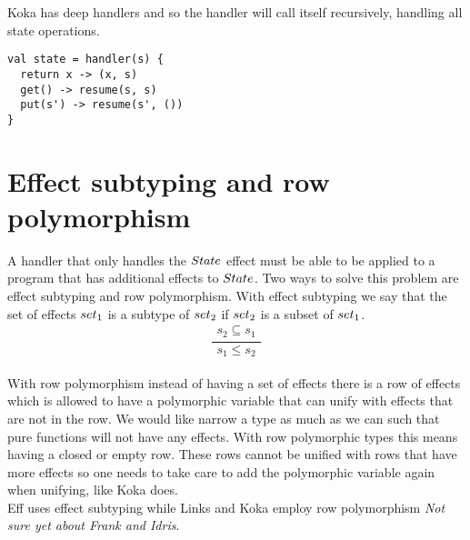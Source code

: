 Koka has deep handlers and so the handler will call itself recursively, handling all state operations.
\begin{lstlisting}
val state = handler(s) {
  return x -> (x, s)
  get() -> resume(s, s)
  put(s') -> resume(s', ())
}
\end{lstlisting}


\section{Effect subtyping and row polymorphism}
A handler that only handles the $\mathnormal{State}$ effect must be able to be applied to a program that has additional effects to $\mathnormal{State}$. Two ways to solve this problem are effect subtyping and row polymorphism. With effect subtyping we say that the set of effects $\mathnormal{set}_1$ is a subtype of $\mathnormal{set}_2$ if
$\mathnormal{set}_2$ is a subset of $\mathnormal{set}_1$. \\
 \[\frac{
	\begin{array}{l}
	s_2 \subseteq s_1
	\end{array}
}{
	s_1 \leq s_2
}\]\\
With row polymorphism instead of having a set of effects there is a row of effects which is allowed to have a polymorphic variable that can unify with effects that are not in the row.
We would like narrow a type as much as we can such that pure functions will not have any effects. With row polymorphic types this means having a closed or empty row. These rows cannot be unified with rows that have more effects so one needs to take care to add the polymorphic variable again when unifying, like Koka does.\\
Eff uses effect subtyping while Links and Koka employ row polymorphism \textit{Not sure yet about Frank and Idris}.

